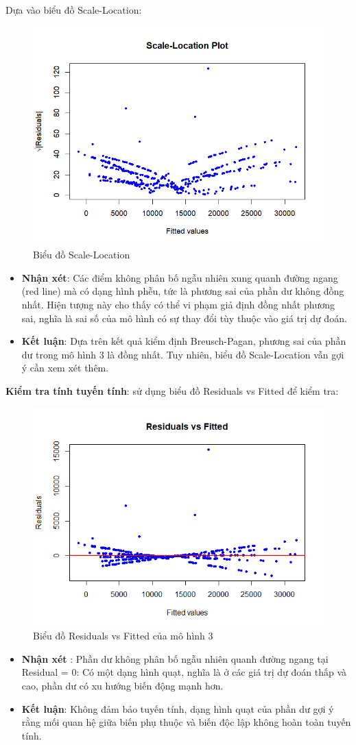 Dựa vào biểu đồ Scale-Location:

\begin{figure}[H]
  \centering
  \includegraphics[width=0.5\linewidth]{graphics/5.5.11.png}
  \caption{Biểu đồ Scale-Location }
\end{figure}

\begin{itemize}
  \item\textbf{Nhận xét}: Các điểm không phân bố ngẫu nhiên xung quanh đường ngang (red line) mà có dạng hình phễu, tức là phương sai của phần dư không đồng nhất. Hiện tượng này cho thấy có thể vi phạm giả định đồng nhất phương sai, nghĩa là sai số của mô hình có sự thay đổi tùy thuộc vào giá trị dự đoán.
  \item\textbf{Kết luận}: Dựa trên kết quả kiểm định Breusch-Pagan, phương sai của phần dư trong mô hình 3 là đồng nhất.
  Tuy nhiên, biểu đồ Scale-Location vẫn gợi ý cần xem xét thêm.
\end{itemize}

\textbf{Kiểm tra tính tuyến tính}: sử dụng biểu đồ Residuals vs Fitted để kiểm tra:

\begin{figure}[H]
  \centering
  \includegraphics[width=0.5\linewidth]{graphics/5.5.12.png}
  \caption{Biểu đồ Residuals vs Fitted của mô hình 3 }
\end{figure}
\begin{itemize}
\item\textbf{Nhận xét }: Phần dư không phân bố ngẫu nhiên quanh đường ngang tại Residual = 0: Có một dạng hình quạt, nghĩa là ở các giá trị dự đoán thấp và cao, phần dư có xu hướng biến động mạnh hơn.
\item\textbf{Kết luận}: Không đảm bảo tuyến tính, dạng hình quạt của phần dư gợi ý rằng mối quan hệ giữa biến phụ thuộc và biến độc lập không hoàn toàn tuyến tính.
\end{itemize}


